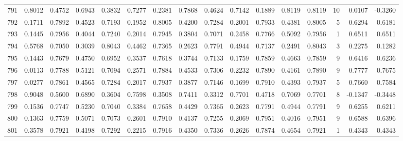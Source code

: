 \begin{tabular}{lrrrrrrrrrrrrrrr}
791 &      0.8012 &  0.4752 &  0.6943 &  0.3832 &  0.7277 &  0.2381 &  0.7868 &  0.4624 &  0.7142 &  0.1889 &   0.8119 &     0.8119 &     10 &                    0.0107 &                    -0.3260 \\
792 &      0.1711 &  0.7892 &  0.4523 &  0.7193 &  0.1952 &  0.8005 &  0.4200 &  0.7284 &  0.2001 &  0.7933 &   0.4381 &     0.8005 &      5 &                    0.6294 &                     0.6181 \\
793 &      0.1445 &  0.7956 &  0.4044 &  0.7240 &  0.2014 &  0.7945 &  0.3804 &  0.7071 &  0.2458 &  0.7766 &   0.5092 &     0.7956 &      1 &                    0.6511 &                     0.6511 \\
794 &      0.5768 &  0.7050 &  0.3039 &  0.8043 &  0.4462 &  0.7365 &  0.2623 &  0.7791 &  0.4944 &  0.7137 &   0.2491 &     0.8043 &      3 &                    0.2275 &                     0.1282 \\
795 &      0.1443 &  0.7679 &  0.4750 &  0.6952 &  0.3537 &  0.7618 &  0.3744 &  0.7133 &  0.1759 &  0.7859 &   0.4663 &     0.7859 &      9 &                    0.6416 &                     0.6236 \\
796 &      0.0113 &  0.7788 &  0.5121 &  0.7094 &  0.2571 &  0.7884 &  0.4533 &  0.7306 &  0.2232 &  0.7890 &   0.4161 &     0.7890 &      9 &                    0.7777 &                     0.7675 \\
797 &      0.0277 &  0.7861 &  0.4565 &  0.7284 &  0.2017 &  0.7937 &  0.3877 &  0.7146 &  0.1699 &  0.7910 &   0.4393 &     0.7937 &      5 &                    0.7660 &                     0.7584 \\
798 &      0.9048 &  0.5600 &  0.6890 &  0.3604 &  0.7598 &  0.3508 &  0.7411 &  0.3312 &  0.7701 &  0.4718 &   0.7069 &     0.7701 &      8 &                   -0.1347 &                    -0.3448 \\
799 &      0.1536 &  0.7747 &  0.5230 &  0.7040 &  0.3384 &  0.7658 &  0.4429 &  0.7365 &  0.2623 &  0.7791 &   0.4944 &     0.7791 &      9 &                    0.6255 &                     0.6211 \\
800 &      0.1363 &  0.7759 &  0.5071 &  0.7073 &  0.2601 &  0.7910 &  0.4137 &  0.7255 &  0.2069 &  0.7951 &   0.4016 &     0.7951 &      9 &                    0.6588 &                     0.6396 \\
801 &      0.3578 &  0.7921 &  0.4198 &  0.7292 &  0.2215 &  0.7916 &  0.4350 &  0.7336 &  0.2626 &  0.7874 &   0.4654 &     0.7921 &      1 &                    0.4343 &                     0.4343 \\

\end{tabular}
